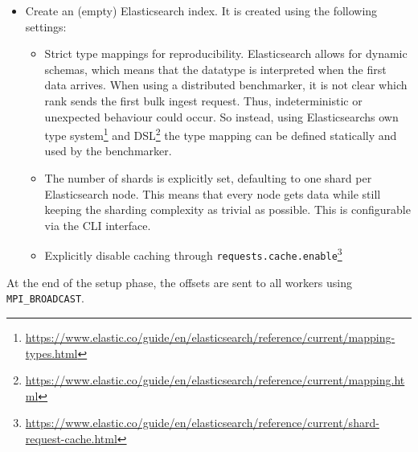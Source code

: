 \begin{itemize}
  \item Create an (empty) Elasticsearch index. It is created using the following settings:
    \begin{itemize}
      \item Strict type mappings for reproducibility. Elasticsearch allows for dynamic schemas, which means that the datatype is interpreted when the first data arrives. When using a distributed benchmarker, it is not clear which rank sends the first bulk ingest request. Thus, indeterministic or unexpected behaviour could occur. So instead, using Elasticsearchs own type system\footnote{\url{https://www.elastic.co/guide/en/elasticsearch/reference/current/mapping-types.html}} and \ac{DSL}\footnote{\url{https://www.elastic.co/guide/en/elasticsearch/reference/current/mapping.html}} the type mapping can be defined statically and used by the benchmarker.
      \item The number of shards is explicitly set, defaulting to one shard per Elasticsearch node. This means that every node gets data while still keeping the sharding complexity as trivial as possible. This is configurable via the \ac{CLI} interface.
      \item Explicitly disable caching through \texttt{requests.cache.enable}\footnote{\url{https://www.elastic.co/guide/en/elasticsearch/reference/current/shard-request-cache.html}}
    \end{itemize}
\end{itemize}
At the end of the setup phase, the offsets are sent to all workers using \texttt{MPI\_BROADCAST}.

